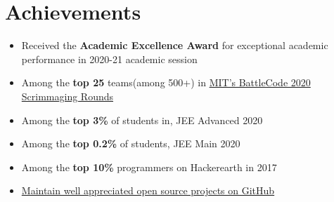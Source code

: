 \section*{\sc Achievements}
\vspace{-2mm}
\hrulefill
\vspace{1mm}

\begin{itemize}
    \item Received the \textbf{Academic Excellence Award} for exceptional academic performance in 2020-21 academic session
    \item Among the \textbf{top 25} teams(among 500+) in  \href{https://github.com/abhishekshree/BattleCode}{MIT's BattleCode 2020 Scrimmaging Rounds}
    \item Among the\textbf{ top 3\%} of students in, JEE Advanced 2020
    \item Among the \textbf{top 0.2\%} of students, JEE Main 2020
    \item Among the \textbf{top 10\%} programmers on Hackerearth in 2017
    \item \href{https://github.com/abhishekshree/}{Maintain well appreciated open source projects on GitHub}
\end{itemize}
